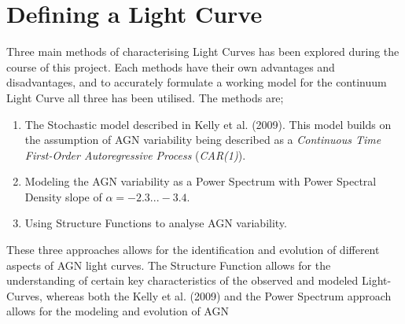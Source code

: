 \documentclass[a4paper, 12pt, twoside]{article}
\begin{document}

\section{Defining a Light Curve}
Three main methods of characterising Light Curves has been explored during the course of this project. Each methods have their own advantages and disadvantages, and to accurately formulate a working model for the continuum Light Curve all three has been utilised. The methods are;
\begin{enumerate}
\item The Stochastic model described in Kelly et al. (2009). This model builds on the assumption of AGN variability being described as a \emph{Continuous Time First-Order Autoregressive Process} (\emph{CAR(1)}).
\item Modeling the AGN variability as a Power Spectrum with Power Spectral Density slope of $\alpha=-2.3...-3.4$.
\item Using Structure Functions to analyse AGN variability.
\end{enumerate}
These three approaches allows for the identification and evolution of different aspects of AGN light curves. The Structure Function allows for the understanding of certain key characteristics of the observed and modeled Light-Curves, whereas both the Kelly et al. (2009) and the Power Spectrum approach allows for the modeling and evolution of AGN 
\end{document}
